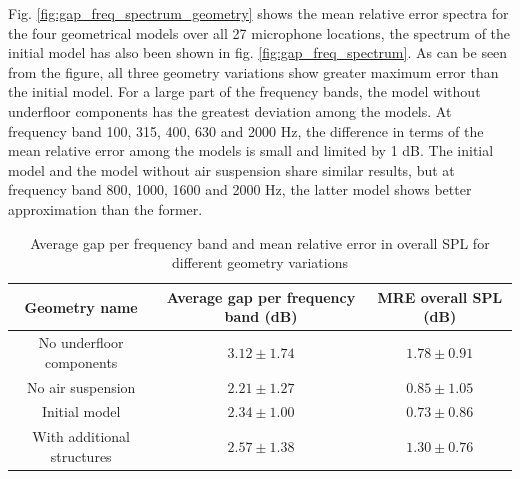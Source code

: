 Fig. \ref{fig:gap_freq_spectrum_geometry} shows the mean relative error spectra for the four geometrical models over all 27 microphone locations, the spectrum of the initial model has also been shown in fig. \ref{fig:gap_freq_spectrum}. As can be seen from the figure, all three geometry variations show greater maximum error than the initial model. For a large part of the frequency bands, the model without underfloor components has the greatest deviation among the models. At frequency band 100, 315, 400, 630 and 2000 Hz, the difference in terms of the mean relative error among the models is small and limited by 1 dB. The initial model and the model without air suspension share similar results, but at frequency band 800, 1000, 1600 and 2000 Hz, the latter model shows better approximation than the former.

\begin{table}[H]
	\centering
	\caption{Average gap per frequency band and mean relative error in overall SPL for different geometry variations}
	\label{tab:geometry_variation_MRE}
	\begin{tabular}{c|c|c}
		Geometry name              & Average gap per frequency band (dB) & MRE overall SPL (dB) \\ \hline
		No underfloor components   & $3.12\pm1.74$                       & $1.78\pm0.91$        \\
		No air suspension          & $2.21\pm1.27$                       & $0.85\pm1.05$        \\
		Initial model              & $2.34\pm1.00$                       & $0.73\pm0.86$        \\
		With additional structures & $2.57\pm1.38$                       & $1.30\pm0.76$       
	\end{tabular}
\end{table}

